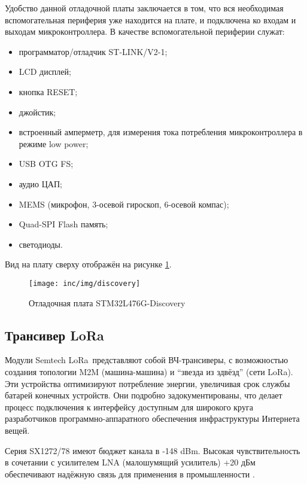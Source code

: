 Удобство данной отладочной платы заключается в том, что вся необходимая 
вспомогательная периферия уже находится на плате, и подключена ко входам и 
выходам микроконтроллера.
В качестве вспомогательной периферии служат:

\begin{itemize}
 \item программатор/отладчик ST-LINK/V2-1;
 \item LCD дисплей;
 \item кнопка RESET;
 \item джойстик;
 \item встроенный амперметр, для измерения тока потребления микроконтроллера в 
режиме low power;
 \item USB OTG FS;
 \item аудио ЦАП;
 \item MEMS (микрофон, 3-осевой гироскоп, 6-осевой компас);
 \item Quad-SPI Flash память;
 \item светодиоды.
\end{itemize}

Вид на плату сверху отображён на рисунке \ref{fig:discovery}.

\begin{figure}[!h]
  \centering
  \texttt{[image: inc/img/discovery]}
  \caption{Отладочная плата STM32L476G-Discovery}
  \label{fig:discovery}
\end{figure}

\subsection{Трансивер LoRa\texttrademark}

Модули Semtech LoRa\texttrademark~представляют собой ВЧ-трансиверы, с 
возможностью создания 
топологии M2M (машина-машина) и ``звезда из здвёзд'' (сети LoRa\texttrademark). 
Эти устройства оптимизируют потребление энергии, увеличивая срок службы батарей 
конечных устройств.
Они подробно задокументированы, что делает процесс подключения к интерфейсу
 доступным для широкого круга разработчиков программно-аппаратного обеспечения 
инфраструктуры Интернета вещей.

Серия SX1272/78 имеют бюджет канала в -148 dBm. 
Высокая чувствительность в сочетании с усилителем LNA (малошумящий усилитель)
 +20 дБм обеспечивают надёжную связь для применения в промышленности 
\cite{Rizzi2017}.

